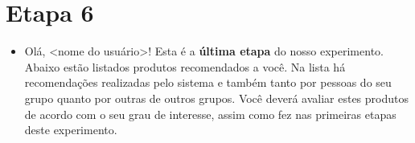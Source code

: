\section*{Etapa 6} %
\label{sec:c_etapa_6}
\begin{itemize}
  \item Olá, <nome do usuário>! Esta é a \textbf{última etapa} do nosso experimento. Abaixo estão listados produtos recomendados a você. Na lista há recomendações realizadas pelo sistema e também tanto por pessoas do seu grupo quanto por outras de outros grupos. Você deverá avaliar estes produtos de acordo com o seu grau de interesse, assim como fez nas primeiras etapas deste experimento.
\end{itemize}

